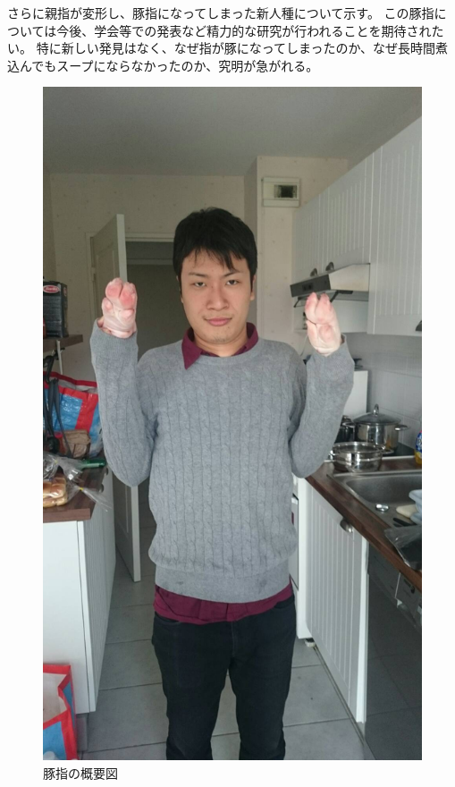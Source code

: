 \documentclass[12pt]{jsarticle}
\begin{document}
さらに親指が変形し、豚指になってしまった新人種について示す。
この豚指については今後、学会等での発表など精力的な研究が行われることを期待されたい。
特に新しい発見はなく、なぜ指が豚になってしまったのか、なぜ長時間煮込んでもスープにならなかったのか、究明が急がれる。
\begin{figure}
\centering
\includegraphics[scale=0.2]{figure/ogawa}
\caption{豚指の概要図}
\end{figure}

\newpage
\clearpage
\end{document}
